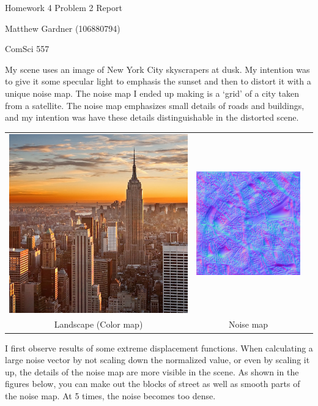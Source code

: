 \documentclass[twoside,11pt]{article}
\theoremstyle{definition}
\begin{document}
\centerline{\Large Homework 4 Problem 2 Report}
\centerline{Matthew Gardner (106880794)}
\centerline{ComSci 557}
\vspace{.2in}

My scene uses an image of New York City skyscrapers at dusk. My intention was to give it some specular light to emphasis the sunset and then to distort it with a unique noise map. The noise map I ended up making is a `grid' of a city taken from a satellite. The noise map emphasizes small details of roads and buildings, and my intention was have these details distinguishable in the distorted scene. 

\begin{center}\begin{tabular}{ccc}
	\includegraphics[width=.3\textwidth]{color-map_landscape} &
	\includegraphics[width=.3\textwidth]{noise-map_city}\\
	Landscape (Color map) & Noise map
\end{tabular}\end{center}
I first observe results of some extreme displacement functions. When calculating a large noise vector by not scaling down the normalized value, or even by scaling it up, the details of the noise map are more visible in the scene. As shown in the figures below, you can make out the blocks of street as well as smooth parts of the noise map. At 5 times, the noise becomes too dense. 
\end{document}
